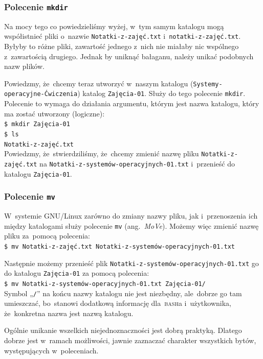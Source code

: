 \documentclass[10pt,t]{beamer}
\begin{document}
\begin{frame}
  \frametitle{Polecenie \texttt{mkdir}}


  Na mocy tego co powiedzieliśmy wyżej, w~tym samym katalogu mogą
  współistnieć pliki o~nazwie \texttt{Notatki-z-zajęć.txt}
  i~\texttt{notatki-z-zajęć.txt}. Byłyby to \alert{różne} pliki, zawartość
  jednego z~nich nie miałaby nic wspólnego z~zawartością drugiego. Jednak
  by uniknąć bałaganu, należy unikać podobnych nazw plików.

  Powiedzmy, że~chcemy teraz utworzyć w~naszym katalogu
  (\texttt{Systemy-operacyjne-Ćwiczenia}) katalog \texttt{Zajęcia-01}.
  Służy do tego polecenie
  {\texttt{mkdir}}. Polecenie to wymaga do działania argumentu, którym
  jest nazwa katalogu, który ma zostać utworzony (logiczne): \\
  \texttt{\$ mkdir Zajęcia-01} \\
  \texttt{\$ ls} \\
   \quad \texttt{Notatki-z-zajęć.txt} \\
  Powiedzmy, że~stwierdziliśmy, że~chcemy zmienić nazwę pliku
  \texttt{Notatki-z-zajęć.txt} na
  \texttt{Notatki-z-systemów-operacyjnych-01.txt} i~przenieść do katalogu
  \texttt{Zajęcia-01}.

\end{frame}





\begin{frame}
  \frametitle{Polecenie \texttt{mv}}


  W~systemie GNU/Linux zarówno do zmiany nazwy pliku, jak i~przenoszenia
  ich między katalogami służy polecenie
  {\texttt{mv}} (ang.~\textit{MoVe}). Możemy więc zmienić nazwę pliku
  za~pomocą polecenia: \\
  \texttt{\$ mv Notatki-z-zajęć.txt Notatki-z-systemów-operacyjnych-01.txt}

  Następnie możemy przenieść plik
  \texttt{Notatki-z-systemów-operacyjnych-01.txt} go do katalogu
  \texttt{Zajęcia-01} za pomocą polecenia: \\
  \texttt{\$ mv Notatki-z-systemów-operacyjnych-01.txt Zajęcia-01/} \\
  Symbol „\texttt{/}” na końcu nazwy katalogu nie jest niezbędny,
  ale~dobrze go tam umieszczać, bo~stanowi dodatkową informację
  dla~\textsc{bash}a i~użytkownika, że~konkretna nazwa jest nazwą
  katalogu.

  Ogólnie unikanie wszelkich niejednoznaczności jest dobrą praktyką.
  Dlatego dobrze jest w~ramach możliwości, jawnie zaznaczać charakter
  wszystkich bytów, występujących w~poleceniach.

\end{frame}
\end{document}
